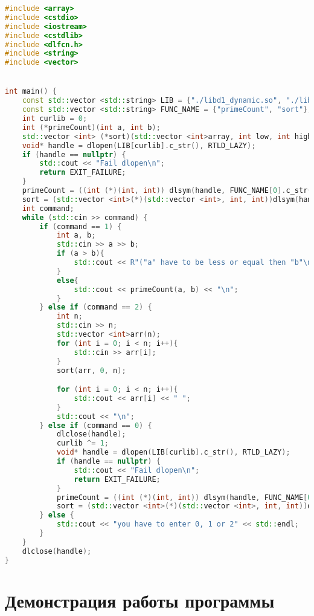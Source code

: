 \documentclass[pdf, unicode, 12pt, a4paper,oneside,fleqn]{article}
\begin{document}
\begin{lstlisting}[language=C++]
#include <array>
#include <cstdio>
#include <iostream>
#include <cstdlib>
#include <dlfcn.h>
#include <string>
#include <vector>


int main() {
    const std::vector <std::string> LIB = {"./libd1_dynamic.so", "./libd2_dynamic.so"};
    const std::vector <std::string> FUNC_NAME = {"primeCount", "sort"};
    int curlib = 0;
    int (*primeCount)(int a, int b);
    std::vector <int> (*sort)(std::vector <int>array, int low, int high);
    void* handle = dlopen(LIB[curlib].c_str(), RTLD_LAZY);
    if (handle == nullptr) {
        std::cout << "Fail dlopen\n";
        return EXIT_FAILURE;
    }
    primeCount = ((int (*)(int, int)) dlsym(handle, FUNC_NAME[0].c_str()));
    sort = (std::vector <int>(*)(std::vector <int>, int, int))dlsym(handle, FUNC_NAME[1].c_str());
    int command;
    while (std::cin >> command) {
        if (command == 1) {
            int a, b;
            std::cin >> a >> b;
            if (a > b){
                std::cout << R"("a" have to be less or equal then "b"\n)";
            }
            else{
                std::cout << primeCount(a, b) << "\n";
            }
        } else if (command == 2) {
            int n;
            std::cin >> n;
            std::vector <int>arr(n);
            for (int i = 0; i < n; i++){
                std::cin >> arr[i];
            }
            sort(arr, 0, n);

            for (int i = 0; i < n; i++){
                std::cout << arr[i] << " ";
            }
            std::cout << "\n";
        } else if (command == 0) {
            dlclose(handle);
            curlib ^= 1;
            void* handle = dlopen(LIB[curlib].c_str(), RTLD_LAZY);
            if (handle == nullptr) {
                std::cout << "Fail dlopen\n";
                return EXIT_FAILURE;
            }
            primeCount = ((int (*)(int, int)) dlsym(handle, FUNC_NAME[0].c_str()));
            sort = (std::vector <int>(*)(std::vector <int>, int, int))dlsym(handle, FUNC_NAME[1].c_str());
        } else {
            std::cout << "you have to enter 0, 1 or 2" << std::endl;
        }
    }
    dlclose(handle);
}

\end{lstlisting}

\pagebreak

\section{Демонстрация работы программы}
\end{document}
